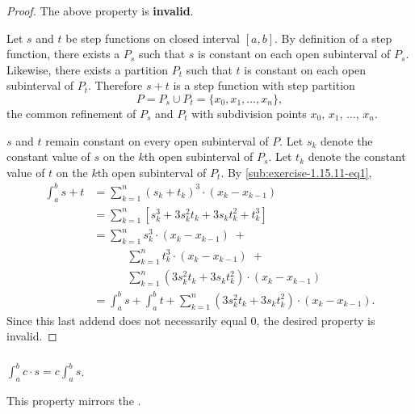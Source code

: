 \documentclass{report}
\begin{document}
  \begin{proof}
    The above property is \textbf{invalid}.

    \vspace{6pt}

    Let $s$ and $t$ be step functions on closed interval $[a, b]$.
    By definition of a step function, there exists a 
      $P_s$ such that $s$ is constant on each open subinterval of $P_s$.
    Likewise, there exists a partition $P_t$ such that $t$ is constant on each
      open subinterval of $P_t$.
    Therefore $s + t$ is a step function with step partition
      $$P = P_s \cup P_t = \{x_0, x_1, \ldots, x_n\},$$
      the common refinement of $P_s$ and $P_t$ with subdivision points
      $x_0$, $x_1$, $\ldots$, $x_n$.

    $s$ and $t$ remain constant on every open subinterval of $P$.
    Let $s_k$ denote the constant value of $s$ on the $k$th open subinterval of
      $P_s$.
    Let $t_k$ denote the constant value of $t$ on the $k$th open subinterval of
      $P_t$.
    By \eqref{sub:exercise-1.15.11-eq1},
      \begin{align*}
        \int_a^b s + t
          & = \sum_{k=1}^n (s_k + t_k)^3 \cdot (x_k - x_{k-1}) \\
          & = \sum_{k=1}^n
              \left[ s_k^3 + 3s_k^2t_k + 3s_kt_k^2 + t_k^3 \right] \\
          & = \sum_{k=1}^n s_k^3 \cdot (x_k - x_{k-1}) \;+ \\
            & \quad\qquad
              \sum_{k=1}^n t_k^3 \cdot (x_k - x_{k-1}) \;+ \\
            & \quad\qquad
              \sum_{k=1}^n (3s_k^2t_k + 3s_kt_k^2) \cdot (x_k - x_{k - 1}) \\
          & = \int_a^b s + \int_a^b t +
              \sum_{k=1}^n (3s_k^2t_k + 3s_kt_k^2) \cdot (x_k - x_{k - 1}).
      \end{align*}
    Since this last addend does not necessarily equal $0$, the desired property
      is invalid.
  \end{proof}

\subsubsection{}%

  $\int_a^b c \cdot s = c \int_a^b s$.

  \begin{note}
    This property mirrors the .
  \end{note}
\end{document}
